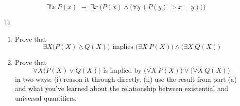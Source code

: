 \documentclass[11pt]{article}
\begin{document}
\begin{solution}
\[
\exists! x\ P(x) \;\equiv\; \exists x\ \Big(P(x)\wedge\big(\forall y\ (P(y)\Rightarrow x=y)\big)\Big)
\]
\end{solution}

\begin{exercise}{14}
    \begin{enumerate}[label=(\alph*)]
        \item Prove that
        \[
        \exists X\big(P(X)\wedge Q(X)\big) \text{ implies } \big(\exists X\ P(X)\big)\wedge\big(\exists X\ Q(X)\big)
        \]
        \item Prove that
        \[
        \forall X\big(P(X)\vee Q(X)\big) \text{ is implied by } \big(\forall X\ P(X)\big)\vee\big(\forall X\ Q(X)\big)
        \]
        in two ways: (i) reason it through directly, (ii) use the
        result from part (a) and what you've learned about the
        relationship between existential and universal quantifiers.
    \end{enumerate}
\end{exercise}
\end{document}

